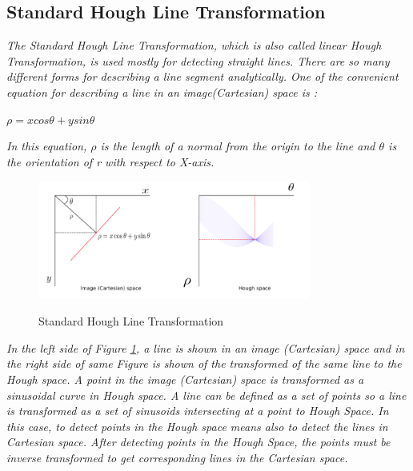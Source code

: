 \subsection{Standard Hough Line Transformation}\label{sec:Standard Hough Line Transformation}
%
\emph{\color{blue}The Standard Hough Line Transformation, which is also called linear Hough Transformation, is used mostly for detecting straight lines. There are so many different forms for describing a line segment analytically. One of the convenient equation for describing a line in an image(Cartesian) space is :}

  \begin{center}

$ \rho = x cos \theta + y sin \theta $

  \end{center}
  
 \emph{\color{red} In this equation, \textit{$ \rho $} is the length of a normal from the origin to the line and \textit{$ \theta $} is the orientation of \textit{r} with respect to X-axis.}
 
 
 \begin{figure}[H]
 \centering
  \includegraphics[width=0.8\textwidth]{./Bilder/Standard_Hough_Line_Transformation.png}\label{Standard_Hough_Line_Transformation_fig}
  \caption{Standard Hough Line Transformation\cite{Standard_Hough_Transformation}}
\end{figure}
 
\emph{\color{blue}In the left side of Figure \ref{Standard_Hough_Line_Transformation_fig}, a line is shown in an image (Cartesian) space and in the right side of same Figure is shown of the transformed of the same line to the Hough space. A point in the image (Cartesian) space is transformed as a sinusoidal curve in Hough space. A line can be defined as a set of points so a line is transformed as a set of sinusoids intersecting at a point to Hough Space. In this case, to detect points in the Hough space means also to detect the lines in Cartesian space. After detecting points in the Hough Space, the points must be inverse transformed to get corresponding lines in the Cartesian space.}

